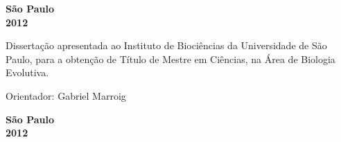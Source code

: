 \begin{titlepage}

\begin{center}
{\LARGE \nomedoaluno}
\par
\vspace{200pt}
{\Huge \titulo}
\par
\vfill
\textbf{{\large São Paulo}\\
{\large 2012}}
\end{center}
\end{titlepage}

\pagestyle{empty}
\cleardoublepage


\begin{center}
{\LARGE \nomedoaluno}
\par
\vspace{200pt}
{\Huge \titulo}
\end{center}
\par
\vspace{90pt}
\hspace*{175pt}\parbox{7.6cm}{{\large Dissertação apresentada ao Instituto de Biociências da Universidade de São Paulo, para a obtenção de Título de Mestre em Ciências, na Área de Biologia Evolutiva.}}

\par
\vspace{1em}
\hspace*{175pt}\parbox{7.6cm}{{\large Orientador: Gabriel Marroig}}

\par
\vfill
\begin{center}
\textbf{{\large São Paulo}\\
{\large 2012}}
\end{center}

\newpage

